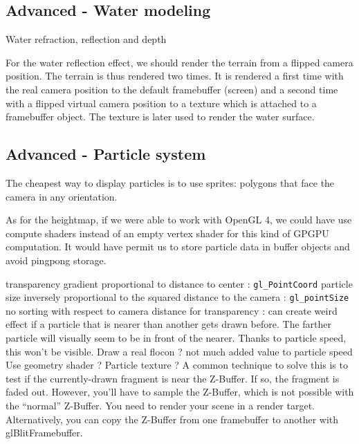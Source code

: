 \documentclass[a4paper,11pt]{article}
\begin{document}
\subsection{Advanced - Water modeling}

Water refraction, reflection and depth

For the water reflection effect, we should render the terrain from a flipped camera position. The terrain is thus rendered two times. It is rendered a first time with the real camera position to the default framebuffer (screen) and a second time with a flipped virtual camera position to a texture which is attached to a framebuffer object. The texture is later used to render the water surface.

\subsection{Advanced - Particle system}

The cheapest way to display particles is to use sprites: polygons that face the camera
in any orientation.

As for the heightmap, if we were able to work with OpenGL 4, we could have use compute shaders instead of an empty vertex shader for this kind of GPGPU computation. It would have permit us to store particle data in buffer objects and avoid pingpong storage.

transparency gradient proportional to distance to center : \texttt{gl\_PointCoord}
particle size inversely proportional to the squared distance to the camera : \texttt{gl\_pointSize}
no sorting with respect to camera distance for transparency : can create weird effect if a particle that is nearer than another gets drawn before. The farther particle will visually seem to be in front of the nearer. Thanks to particle speed, this won't be visible.
Draw a real flocon ? not much added value to particle speed
Use geometry shader ?
Particle texture ?
A common technique to solve this is to test if the currently-drawn fragment is near the Z-Buffer. If so, the fragment is faded out. However, you’ll have to sample the Z-Buffer, which is not possible with the “normal” Z-Buffer. You need to render your scene in a render target. Alternatively, you can copy the Z-Buffer from one framebuffer to another with glBlitFramebuffer.
\end{document}

